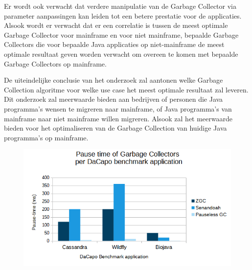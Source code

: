 Er wordt ook verwacht dat verdere manipulatie van de Garbage Collector via parameter aanpassingen kan leiden tot een betere prestatie voor de applicaties.
Alsook wordt er verwacht dat er een correlatie is tussen de meest optimale Garbage Collector voor mainframe en voor niet mainframe, bepaalde Garbage Collectors die voor bepaalde Java applicaties op niet-mainframe de meest optimale resultaat geven worden verwacht om overeen te komen met bepaalde Garbage Collectors op mainframe.

De uiteindelijke conclusie van het onderzoek zal aantonen welke Garbage Collection algoritme voor welke use case het meest optimale resultaat zal leveren.
Dit onderzoek zal meerwaarde bieden aan bedrijven of personen die Java programma's wensen te migreren naar mainframe, of Java programma's van mainframe naar niet mainframe willen migreren.
Alsook zal het meerwaarde bieden voor het optimaliseren van de Garbage Collection van huidige Java programma's op mainframe.

\vspace{\baselineskip}

\begin{graph1section}
    \caption{Simulaties van verwachte resultaten van de totale Pause time van bepaalde Garbage Collectors en de gebruikte geheugen op piekmoment voor enkele DaCapo benchmark applicaties:}
    \begin{figure}[hbt!]
        \centering
        \includegraphics[width=1\columnwidth]{img/graph2.png}
    \end{figure}
\end{graph1section}


